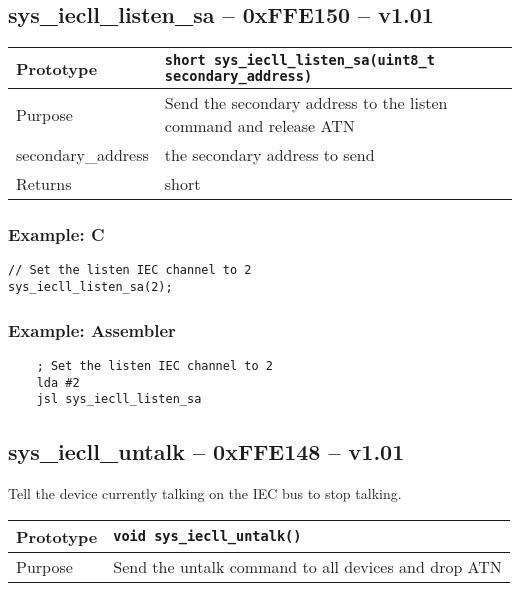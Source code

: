 \subsection*{sys\_iecll\_listen\_sa -- 0xFFE150 -- v1.01}
\begin{table}[!h]\begin{tabular}{|l||l|} \hline
Prototype & \lstinline!short sys_iecll_listen_sa(uint8_t secondary_address)! \\ \hline
Purpose & Send the secondary address to the {\sc listen} command and release ATN \\ \hline
secondary\_address & the secondary address to send \\ \hline
Returns & short \\ \hline
\end{tabular}\end{table}

\subsubsection*{Example: C}
\begin{lstlisting}
// Set the listen IEC channel to 2
sys_iecll_listen_sa(2);
\end{lstlisting}

\subsubsection*{Example: Assembler}
\begin{verbatim}
    ; Set the listen IEC channel to 2
    lda #2
    jsl sys_iecll_listen_sa
\end{verbatim}


\subsection*{sys\_iecll\_untalk -- 0xFFE148 -- v1.01}
Tell the device currently talking on the IEC bus to stop talking.

\bigskip

\begin{table}[!h]\begin{tabular}{|l||l|} \hline
Prototype & \lstinline!void sys_iecll_untalk()! \\ \hline
Purpose & Send the {\sc untalk} command to all devices and drop ATN \\ \hline
\end{tabular}\end{table}

